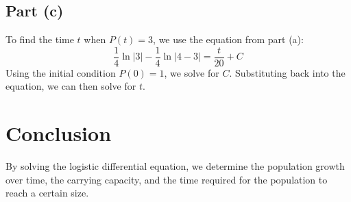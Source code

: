\documentclass{article}
\begin{document}
\subsection*{Part (c)}
To find the time \( t \) when \( P(t) = 3 \), we use the equation from part (a):
\[ \frac{1}{4}\ln{|3|} - \frac{1}{4}\ln{|4 - 3|} = \frac{t}{20} + C \]
Using the initial condition \( P(0) = 1 \), we solve for \( C \). Substituting back into the equation, we can then solve for \( t \).

\section*{Conclusion}
By solving the logistic differential equation, we determine the population growth over time, the carrying capacity, and the time required for the population to reach a certain size.
\end{document}

